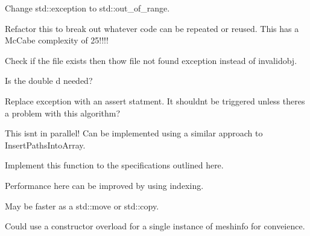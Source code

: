 \begin{DoxyRefList}
Change std\+::exception to std\+::out\+\_\+of\+\_\+range. 

Refactor this to break out whatever code can be repeated or reused. This has a Mc\+Cabe complexity of 25!!!! 
\item[Member \mbox{\hyperlink{a00280_aec1df746155d224838048d3a43c2fe96}{HF\+::Geometry\+::Load\+Raw\+Vertices}} (std\+::string path)]\label{a00264__todo000013}%
%
Check if the file exists then thow file not found exception instead of invalidobj. 
\item[Class \mbox{\hyperlink{a00282}{HF\+::Pathfinding\+::vertex\+\_\+data}} ]\label{a00264__todo000014}%
%
Is the double d needed? 
\item[Member \mbox{\hyperlink{a00282_a977e4c93a977ab4e9e784d1e6fec79f4}{HF\+::Pathfinding\+::Construct\+Shortest\+Path\+From\+Pred}} (int start, int end, const std\+::vector$<$ size\+\_\+t $>$ \&pred, const std\+::vector$<$ float $>$ \&distances)]\label{a00264__todo000015}%
%
Replace exception with an assert statment. It shouldn\textquotesingle{}t be triggered unless there\textquotesingle{}s a problem with this algorithm?  
\item[Member \mbox{\hyperlink{a00282_a15badb9d0a17849de7b21105605c9c91}{HF\+::Pathfinding\+::Find\+Paths}} (\mbox{\hyperlink{a01139}{Boost\+Graph}} $\ast$bg, const std\+::vector$<$ int $>$ \&start\+\_\+points, const std\+::vector$<$ int $>$ \&end\+\_\+points)]\label{a00264__todo000016}%
%
This isn\textquotesingle{}t in parallel! Can be implemented using a similar approach to Insert\+Paths\+Into\+Array.  
\item[Member \mbox{\hyperlink{a00282_a336118692fd29dd27f8825ec5bb16b56}{HF\+::Pathfinding\+::Find\+All\+Paths}} (\mbox{\hyperlink{a01139}{Boost\+Graph}} $\ast$bg)]\label{a00264__todo000017}%
%
Implement this function to the specifications outlined here.  
\item[Member \mbox{\hyperlink{a00277_a9a8051c9b70fc0ae60337d4a38bf5f57}{HF\+::Ray\+Tracer\+::vectors\+To\+Buffers}} (const std\+::vector$<$ std\+::array$<$ float, 3 $>$$>$ \&vertices, std\+::vector$<$ Triangle $>$ \&Tribuffer, std\+::vector$<$ Vertex $>$ \&Vbuffer)]\label{a00264__todo000018}%
%
Performance here can be improved by using indexing.  
\item[Member \mbox{\hyperlink{a00277_aac8c0b245ea813969c50b6496cc67945}{HF\+::Ray\+Tracer\+::buffers\+To\+Structs}} (std\+::vector$<$ float $>$ \&in\+\_\+vertices, std\+::vector$<$ int $>$ \&in\+\_\+indices, std\+::vector$<$ Vertex $>$ \&out\+\_\+vertices, std\+::vector$<$ Triangle $>$ \&out\+\_\+triangles)]\label{a00264__todo000019}%
%
May be faster as a std\+::move or std\+::copy.  
\item[Class \mbox{\hyperlink{a01163}{HF\+::Ray\+Tracer\+::Embree\+Ray\+Tracer}} ]\label{a00264__todo000020}%
%
Could use a constructor overload for a single instance of meshinfo for conveience. 


\end{DoxyRefList}
